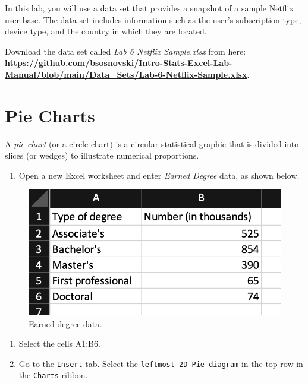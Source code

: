 \documentclass[
]{book}
\providecommand{\tightlist}{%
  \setlength{\itemsep}{0pt}\setlength{\parskip}{0pt}}
\begin{document}
In this lab, you will use a data set that provides a snapshot of a sample Netflix user base. The data set includes information such as the user's subscription type, device type, and the country in which they are located.

Download the data set called \emph{Lab 6 Netflix Sample.xlsx} from here: \href{https://github.com/bsosnovski/Intro-Stats-Excel-Lab-Manual/blob/main/Data_Sets/Lab-6-Netflix-Sample.xlsx}{\textbf{https://github.com/bsosnovski/Intro-Stats-Excel-Lab-Manual/blob/main/Data\_Sets/Lab-6-Netflix-Sample.xlsx}}.

\hypertarget{pie-charts}{%
\section{Pie Charts}\label{pie-charts}}

A \emph{pie chart} (or a circle chart) is a circular statistical graphic that is divided into slices (or wedges) to illustrate numerical proportions.

\begin{enumerate}
\def\labelenumi{\arabic{enumi}.}
\tightlist
\item
  Open a new Excel worksheet and enter \emph{Earned Degree} data, as shown below.
\end{enumerate}

\begin{figure}

{\centering \includegraphics[width=0.5\linewidth]{degree-earned-data} 

}

\caption{Earned degree data.}\label{fig:degree-earned-data}
\end{figure}

\begin{enumerate}
\def\labelenumi{\arabic{enumi}.}
\setcounter{enumi}{1}
\tightlist
\item
  Select the cells A1:B6.
\item
  Go to the \texttt{Insert} tab. Select the \texttt{leftmost\ 2D\ Pie\ diagram} in the top row in the \texttt{Charts} ribbon.
\end{enumerate}
\end{document}
